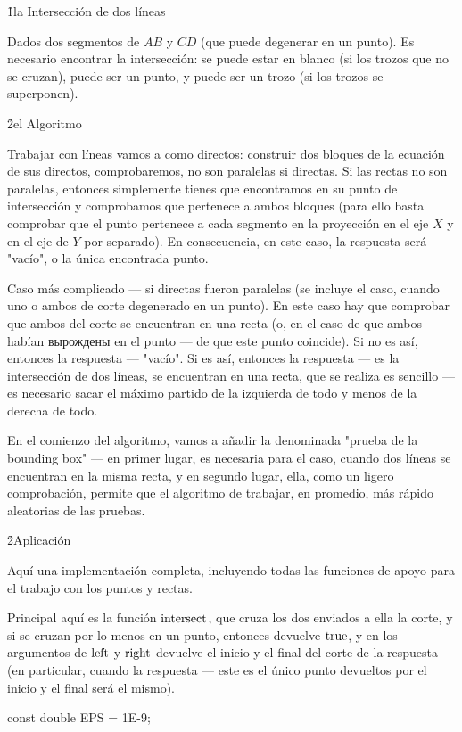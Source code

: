 \h1{la Intersección de dos líneas}

Dados dos segmentos de $AB$ y $CD$ (que puede degenerar en un punto). Es necesario encontrar la intersección: se puede estar en blanco (si los trozos que no se cruzan), puede ser un punto, y puede ser un trozo (si los trozos se superponen).


\h2{el Algoritmo}

Trabajar con líneas vamos a como directos: construir dos bloques de la ecuación de sus directos, comprobaremos, no son paralelas si directas. Si las rectas no son paralelas, entonces simplemente tienes que encontramos en su punto de intersección y comprobamos que pertenece a ambos bloques (para ello basta comprobar que el punto pertenece a cada segmento en la proyección en el eje $X$ y en el eje de $Y$ por separado). En consecuencia, en este caso, la respuesta será "vacío", o la única encontrada punto.

Caso más complicado --- si directas fueron paralelas (se incluye el caso, cuando uno o ambos de corte degenerado en un punto). En este caso hay que comprobar que ambos del corte se encuentran en una recta (o, en el caso de que ambos habían вырождены en el punto --- de que este punto coincide). Si no es así, entonces la respuesta --- "vacío". Si es así, entonces la respuesta --- es la intersección de dos líneas, se encuentran en una recta, que se realiza es sencillo --- es necesario sacar el máximo partido de la izquierda de todo y menos de la derecha de todo.

En el comienzo del algoritmo, vamos a añadir la denominada "prueba de la bounding box" --- en primer lugar, es necesaria para el caso, cuando dos líneas se encuentran en la misma recta, y en segundo lugar, ella, como un ligero comprobación, permite que el algoritmo de trabajar, en promedio, más rápido aleatorias de las pruebas.


\h2{Aplicación}

Aquí una implementación completa, incluyendo todas las funciones de apoyo para el trabajo con los puntos y rectas.

Principal aquí es la función $\rm intersect$, que cruza los dos enviados a ella la corte, y si se cruzan por lo menos en un punto, entonces devuelve $\rm true$, y en los argumentos de $\rm left$ y $\rm right$ devuelve el inicio y el final del corte de la respuesta (en particular, cuando la respuesta --- este es el único punto devueltos por el inicio y el final será el mismo).

\code
const double EPS = 1E-9;

